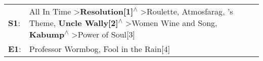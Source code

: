 \begin{supertabular}{p{0.03\textwidth}p{0.92\textwidth}}
 \textbf{S1}:  &  All In Time\textsuperscript{} \textgreater \enspace \textbf{Resolution[1]\textsuperscript{$\wedge$}} \textgreater \enspace Roulette\textsuperscript{}, \enspace Atmosfarag\textsuperscript{}, 's Theme\textsuperscript{}, \enspace \textbf{Uncle Wally[2]\textsuperscript{$\wedge$}} \textgreater \enspace Women Wine and Song\textsuperscript{}, \enspace \textbf{Kabump\textsuperscript{$\wedge$}} \textgreater \enspace Power of Soul[3]\textsuperscript{}  \enspace  \\
 \textbf{E1}:  &                                                                                                                                                                                                                                                                                                                                                                                       Professor Wormbog\textsuperscript{}, \enspace Fool in the Rain[4]\textsuperscript{}  \enspace  \\
\end{supertabular}
